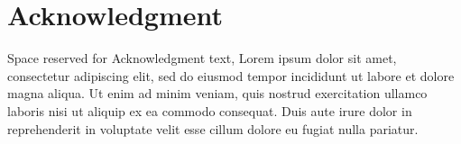 \documentclass[conference]{IEEEtran}
\begin{document}
\section*{Acknowledgment}
Space reserved for Acknowledgment text, Lorem ipsum dolor sit amet, consectetur adipiscing elit,
sed do eiusmod tempor incididunt ut labore et dolore magna aliqua. Ut enim ad minim veniam, quis 
nostrud exercitation ullamco laboris nisi ut aliquip ex ea commodo consequat. Duis aute irure dolor
in reprehenderit in voluptate velit esse cillum dolore eu fugiat nulla pariatur. 




\end{document}
